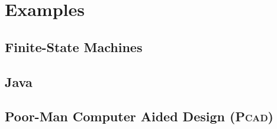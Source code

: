 \section{Examples}
\label{sec:Examples}

\subsection{Finite-State Machines}
\label{sec:FSM}


\subsection{Java}
\label{sec:Java}


\subsection{Poor-Man Computer Aided Design (\textsc{Pcad)}}
\label{sec:PCAD}
